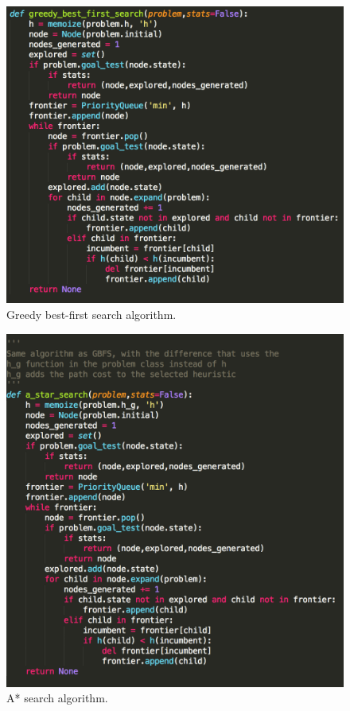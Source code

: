 \documentclass[12pt, letter]{article}
\begin{document}
\begin{figure}[htb]
  \centering
  \includegraphics[width=0.9 \textwidth]{./graphs/gbfs.png}
  \caption{Greedy best-first search algorithm.}
\end{figure}

\begin{figure}[htb]
  \centering
  \includegraphics[width=0.9 \textwidth]{./graphs/a_star.png}
  \caption{A* search algorithm.}
\end{figure}
\end{document}
